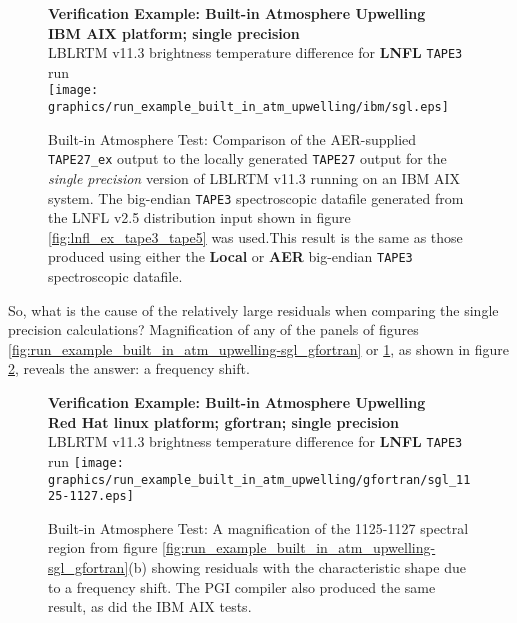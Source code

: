 \begin{figure}[htp]
  \centering
  \qquad\sffamily\textbf{Verification Example: Built-in Atmosphere Upwelling}\\
  \qquad\sffamily\textbf{IBM AIX platform; single precision}\\
  \qquad\textsf{LBLRTM v11.3 brightness temperature difference for \textbf{LNFL} \texttt{TAPE3} run}\\
  \texttt{[image: graphics/run\_example\_built\_in\_atm\_upwelling/ibm/sgl.eps]}
  \caption{Built-in Atmosphere Test: Comparison of the AER-supplied \texttt{TAPE27\_ex} output to the locally generated \texttt{TAPE27} output for the \textsl{single precision} version of LBLRTM v11.3 running on an IBM AIX system. The big-endian \texttt{TAPE3} spectroscopic datafile generated from the LNFL v2.5 distribution input shown in figure \ref{fig:lnfl_ex_tape3_tape5} was used.This result is the same as those produced using either the \textbf{Local} or \textbf{AER} big-endian \texttt{TAPE3} spectroscopic datafile.}
  \label{fig:run_example_built_in_atm_upwelling-sgl_ibm}
\end{figure}

So, what is the cause of the relatively large residuals when comparing the single precision calculations? Magnification of any of the panels of figures \ref{fig:run_example_built_in_atm_upwelling-sgl_gfortran} or \ref{fig:run_example_built_in_atm_upwelling-sgl_ibm}, as shown in figure \ref{fig:run_example_built_in_atm_upwelling-sgl_gfortran_1125-1127}, reveals the answer: a frequency shift.

\begin{figure}[htp]
  \centering
  \qquad\sffamily\textbf{Verification Example: Built-in Atmosphere Upwelling}\\
  \qquad\sffamily\textbf{Red Hat linux platform; gfortran; single precision}\\
  \qquad\textsf{LBLRTM v11.3 brightness temperature difference for \textbf{LNFL} \texttt{TAPE3} run}
  \texttt{[image: graphics/run\_example\_built\_in\_atm\_upwelling/gfortran/sgl\_1125-1127.eps]}
  \caption{Built-in Atmosphere Test: A magnification of the 1125-1127\invcm{} spectral region from figure \ref{fig:run_example_built_in_atm_upwelling-sgl_gfortran}(b) showing residuals with the characteristic shape due to a frequency shift. The PGI compiler also produced the same result, as did the IBM AIX tests.}
  \label{fig:run_example_built_in_atm_upwelling-sgl_gfortran_1125-1127}
\end{figure}

